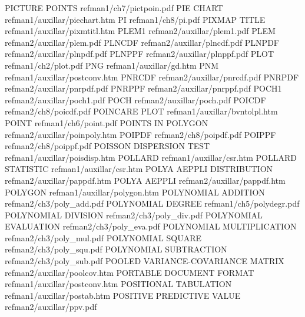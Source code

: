 PICTURE POINTS                          refman1/ch7/pictpoin.pdf
PIE CHART                               refman1/auxillar/piechart.htm
PI                                      refman1/ch8/pi.pdf
PIXMAP TITLE                            refman1/auxillar/pixmtitl.htm
PLEM1                                   refman2/auxillar/plem1.pdf
PLEM                                    refman2/auxillar/plem.pdf
PLNCDF                                  refman2/auxillar/plncdf.pdf
PLNPDF                                  refman2/auxillar/plnpdf.pdf
PLNPPF                                  refman2/auxillar/plnppf.pdf
PLOT                                    refman1/ch2/plot.pdf
PNG                                     refman1/auxillar/gd.htm
PNM                                     refman1/auxillar/postconv.htm
PNRCDF                                  refman2/auxillar/pnrcdf.pdf
PNRPDF                                  refman2/auxillar/pnrpdf.pdf
PNRPPF                                  refman2/auxillar/pnrppf.pdf
POCH1                                   refman2/auxillar/poch1.pdf
POCH                                    refman2/auxillar/poch.pdf
POICDF                                  refman2/ch8/poicdf.pdf
POINCARE PLOT                           refman1/auxillar/bvntolpl.htm
POINT                                   refman1/ch6/point.pdf
POINTS IN POLYGON                       refman2/auxillar/poinpoly.htm
POIPDF                                  refman2/ch8/poipdf.pdf
POIPPF                                  refman2/ch8/poippf.pdf
POISSON DISPERSION TEST                 refman1/auxillar/poisdisp.htm
POLLARD                                 refman1/auxillar/csr.htm
POLLARD STATISTIC                       refman1/auxillar/csr.htm
POLYA AEPPLI DISTRIBUTION               refman2/auxillar/pappdf.htm
POLYA AEPPLI                            refman2/auxillar/pappdf.htm
POLYGON                                 refman1/auxillar/polygon.htm
POLYNOMIAL ADDITION                     refman2/ch3/poly_add.pdf
POLYNOMIAL DEGREE                       refman1/ch5/polydegr.pdf
POLYNOMIAL DIVISION                     refman2/ch3/poly_div.pdf
POLYNOMIAL EVALUATION                   refman2/ch3/poly_eva.pdf
POLYNOMIAL MULTIPLICATION               refman2/ch3/poly_mul.pdf
POLYNOMIAL SQUARE                       refman2/ch3/poly_squ.pdf
POLYNOMIAL SUBTRACTION                  refman2/ch3/poly_sub.pdf
POOLED VARIANCE-COVARIANCE MATRIX       refman2/auxillar/poolcov.htm
PORTABLE DOCUMENT FORMAT                refman1/auxillar/postconv.htm
POSITIONAL TABULATION                   refman1/auxillar/postab.htm
POSITIVE PREDICTIVE VALUE               refman2/auxillar/ppv.pdf

